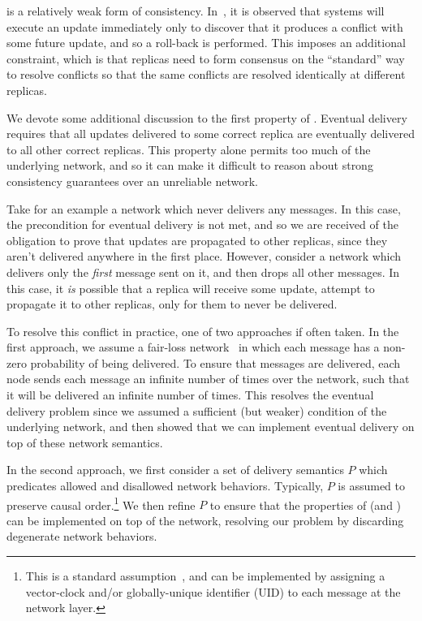 \EC is a relatively weak form of consistency. In~\citep{shapiro11}, it is
observed that \EC systems will execute an update immediately only to discover
that it produces a conflict with some future update, and so a roll-back is
performed. This imposes an additional constraint, which is that replicas need
to form consensus on the ``standard'' way to resolve conflicts so that the same
conflicts are resolved identically at different replicas.

We devote some additional discussion to the first property of \EC. Eventual
delivery requires that all updates delivered to some correct replica are
eventually delivered to all other correct replicas. This property alone permits
too much of the underlying network, and so it can make it difficult to reason
about strong consistency guarantees over an unreliable network.

Take for an example a network which never delivers any messages. In this case,
the precondition for eventual delivery is not met, and so we are received of the
obligation to prove that updates are propagated to other replicas, since they
aren't delivered anywhere in the first place. However, consider a network which
delivers only the \emph{first} message sent on it, and then drops all other
messages. In this case, it \emph{is} possible that a replica will receive some
update, attempt to propagate it to other replicas, only for them to never be
delivered.

To resolve this conflict in practice, one of two approaches if often taken. In
the first approach, we assume a fair-loss network~\citep{cachin11} in which each
message has a non-zero probability of being delivered. To ensure that messages
are delivered, each node sends each message an infinite number of times over the
network, such that it will be delivered an infinite number of times. This
resolves the eventual delivery problem since we assumed a sufficient (but
weaker) condition of the underlying network, and then showed that we can
implement eventual delivery on top of these network semantics.

In the second approach, we first consider a set of delivery semantics $P$ which
predicates allowed and disallowed network behaviors. Typically, $P$ is assumed
to preserve causal order.\footnote{This is a standard
assumption~\citep{shapiro11,gomes17}, and can be implemented by assigning a
vector-clock and/or globally-unique identifier (UID) to each message at the
network layer.} We then refine $P$ to ensure that the properties of \EC (and
\SEC) can be implemented on top of the network, resolving our problem by
discarding degenerate network behaviors.

